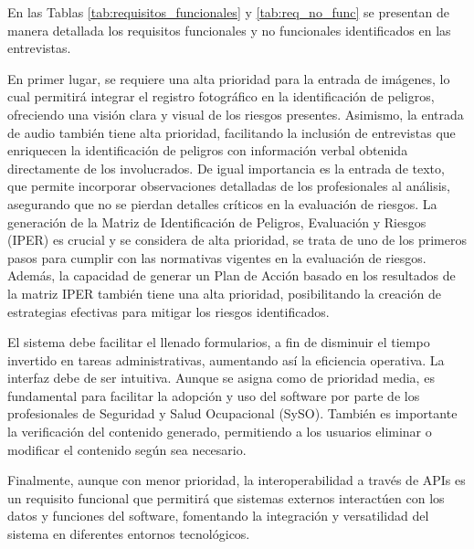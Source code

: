 En las Tablas \ref{tab:requisitos_funcionales} y \ref{tab:req_no_func} se presentan de manera detallada los requisitos funcionales y no funcionales identificados en las entrevistas.

\begin{table}[htb]
    \centering
    \caption{Tabla de Requerimientos Funcionales}
    
    \label{tab:requisitos_funcionales}
\end{table}

En primer lugar, se requiere una alta prioridad para la entrada de imágenes, lo cual permitirá integrar el registro fotográfico en la identificación de peligros, ofreciendo una visión clara y visual de los riesgos presentes. Asimismo, la entrada de audio también tiene alta prioridad, facilitando la inclusión de entrevistas que enriquecen la identificación de peligros con información verbal obtenida directamente de los involucrados. De igual importancia es la entrada de texto, que permite incorporar observaciones detalladas de los profesionales al análisis, asegurando que no se pierdan detalles críticos en la evaluación de riesgos. La generación de la Matriz de Identificación de Peligros, Evaluación y Riesgos (IPER) es crucial y se considera de alta prioridad, se trata de uno de los primeros pasos para cumplir con las normativas vigentes en la evaluación de riesgos. Además, la capacidad de generar un Plan de Acción basado en los resultados de la matriz IPER también tiene una alta prioridad, posibilitando la creación de estrategias efectivas para mitigar los riesgos identificados.

El sistema debe facilitar el llenado formularios, a fin de disminuir el tiempo invertido en tareas administrativas, aumentando así la eficiencia operativa. La interfaz debe de ser intuitiva. Aunque se asigna como de prioridad media, es fundamental para facilitar la adopción y uso del software por parte de los profesionales de Seguridad y Salud Ocupacional (SySO). También es importante la verificación del contenido generado, permitiendo a los usuarios eliminar o modificar el contenido según sea necesario.

Finalmente, aunque con menor prioridad, la interoperabilidad a través de APIs es un requisito funcional que permitirá que sistemas externos interactúen con los datos y funciones del software, fomentando la integración y versatilidad del sistema en diferentes entornos tecnológicos.

\begin{table}[htb]
    \centering
    \caption{Tabla de Requerimientos No Funcionales}
    
    \label{tab:req_no_func}
\end{table}

